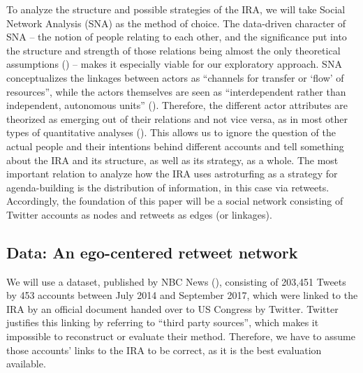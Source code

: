 \documentclass[12pt, titlepage=true, toc=bib]{scrartcl}
\begin{document}
To analyze the structure and possible strategies of the IRA, we will take Social Network Analysis (SNA) as the method of choice. The data-driven character of SNA -- the notion of people relating to each other, and the significance put into the structure and strength of those relations being almost the only theoretical assumptions (\cite[982]{golovchenko_state_2018}) -- makes it especially viable for our exploratory approach. SNA conceptualizes the linkages between actors as \enquote{channels for transfer or \enquote{flow} of resources}, while the actors themselves are seen as ``interdependent rather than independent, autonomous units'' (\cite[4]{wasserman_social_1994}). Therefore, the different actor attributes are theorized as emerging out of their relations and not vice versa, as in most other types of quantitative analyses (\cite[8]{wasserman_social_1994}). This allows us to ignore the question of the actual people and their intentions behind different accounts and tell something about the IRA and its structure, as well as its strategy, as a whole. The most important relation to analyze how the IRA uses astroturfing as a strategy for agenda-building is the distribution of information, in this case via retweets. Accordingly, the foundation of this paper will be a social network consisting of Twitter accounts as nodes and retweets as edges (or linkages).


\subsection{Data: An ego-centered retweet network}

We will use a dataset, published by NBC News (\cite*{popken_twitter_2018}), consisting of 203,451 Tweets by 453 accounts between July 2014 and September 2017, which were linked to the IRA by an official document handed over to US Congress by Twitter. Twitter justifies this linking by referring to ``third party sources'', which makes it impossible to reconstruct or evaluate their method. Therefore, we have to assume those accounts' links to the IRA to be correct, as it is the best evaluation available.
\end{document}
